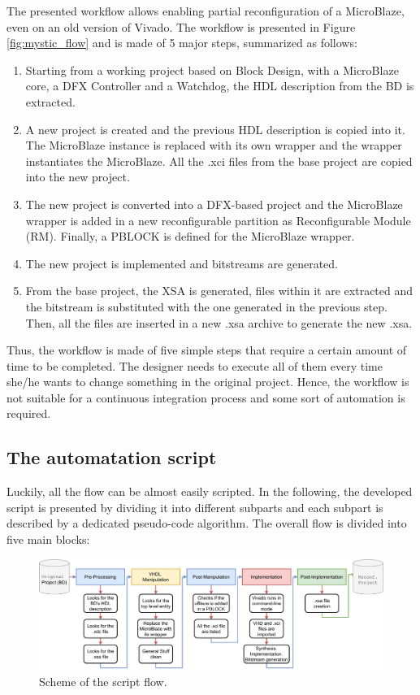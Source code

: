 The presented workflow allows enabling partial reconfiguration of a MicroBlaze, even on an old version of Vivado. The workflow is presented in Figure \ref{fig:mystic_flow} and is made of 5 major steps, summarized as follows:

\begin{enumerate}
    \item Starting from a working project based on Block Design, with a MicroBlaze core, a DFX Controller and a Watchdog, the HDL description from the BD is extracted.
    \item A new project is created and the previous HDL description is copied into it. The MicroBlaze instance is replaced with its own wrapper and the wrapper instantiates the MicroBlaze. All the .xci files from the base project are copied into the new project.
    \item The new project is converted into a DFX-based project and the MicroBlaze wrapper is added in a new reconfigurable partition as Reconfigurable Module (RM). Finally, a PBLOCK is defined for the MicroBlaze wrapper.
    \item The new project is implemented and bitstreams are generated.
    \item From the base project, the XSA is generated, files within it are extracted and the bitstream is substituted with the one generated in the previous step. Then, all the files are inserted in a new .xsa archive to generate the new .xsa.
\end{enumerate}

Thus, the workflow is made of five simple steps that require a certain amount of time to be completed. The designer needs to execute all of them every time she/he wants to change something in the original project. Hence, the workflow is not suitable for a continuous integration process and some sort of automation is required. \bigskip

\subsection{The automatation script}

Luckily, all the flow can be almost easily scripted. In the following, the developed script is presented by dividing it into different subparts and each subpart is described by a dedicated pseudo-code algorithm. The overall flow is divided into five main blocks:

\begin{figure}[H]
\centering
\includegraphics[width=0.95\linewidth]{images/chapter4/script_flow2.pdf}
\caption{Scheme of the script flow.}
\end{figure}

